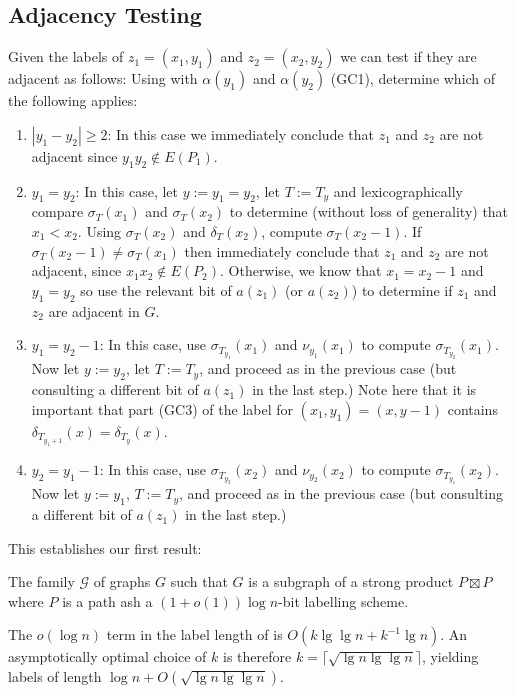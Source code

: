 \documentclass[kpfonts]{patmorin}
\let\ge\geqslant
\begin{document}
\subsection{Adjacency Testing}

Given the labels of $z_1=(x_1,y_1)$ and $z_2=(x_2,y_2)$ we can test if they are adjacent as follows: Using with $\alpha(y_1)$ and $\alpha(y_2)$ (GC1), determine which of the following applies:
\begin{enumerate}
  \item $|y_1-y_2|\ge 2$: In this case we immediately conclude that $z_1$ and $z_2$ are not adjacent since $y_1y_2\not\in E(P_1)$.  
  
  \item $y_1=y_2$: In this case, let $y:=y_1=y_2$, let $T:=T_y$ and lexicographically compare $\sigma_T(x_1)$ and $\sigma_T(x_2)$ to determine (without loss of generality) that $x_1<x_2$.  Using $\sigma_{T}(x_2)$ and $\delta_{T}(x_2)$, compute $\sigma_T(x_2-1)$.  If $\sigma_T(x_2-1)\neq \sigma_T(x_1)$ then immediately conclude that $z_1$ and $z_2$ are not adjacent, since $x_1x_2\not\in E(P_2)$.  Otherwise, we know that $x_1=x_2-1$ and $y_1=y_2$ so use the relevant bit of $a(z_1)$ (or $a(z_2)$) to determine if $z_1$ and $z_2$ are adjacent in $G$.
  
  \item $y_1=y_2-1$: In this case, use $\sigma_{T_{y_1}}(x_1)$ and $\nu_{y_1}(x_1)$ to compute $\sigma_{T_{y_2}}(x_1)$.  Now let $y:=y_2$, let $T:=T_{y}$, and proceed as in the previous case (but consulting a different bit of $a(z_1)$ in the last step.)  Note here that it is important that part (GC3) of the label for $(x_1,y_1)=(x,y-1)$ contains $\delta_{T_{y_1+1}}(x)=\delta_{T_{y}}(x)$.
  
  \item $y_2=y_1-1$: In this case, use $\sigma_{T_{y_2}}(x_2)$ and $\nu_{y_2}(x_2)$ to compute $\sigma_{T_{y_1}}(x_2)$.  Now let $y:=y_1$, $T:=T_{y}$, and proceed as in the previous case (but consulting a different bit of $a(z_1)$ in the last step.)
\end{enumerate}

This establishes our first result:

\begin{thm}
  The family $\mathcal{G}$ of graphs $G$ such that $G$ is a subgraph of a strong product $P\boxtimes P$ where $P$ is a path ash a $(1+o(1))\log n$-bit labelling scheme.
\end{thm}

\begin{rem}
  The $o(\log n)$ term in the label length of  is $O(k\lg\lg n + k^{-1}\lg n)$.  An asymptotically optimal choice of $k$ is therefore $k=\lceil\sqrt{\lg n\lg\lg n}\rceil$, yielding labels of length $\log n + O(\sqrt{\lg n\lg\lg n})$.
\end{rem}
\end{document}
